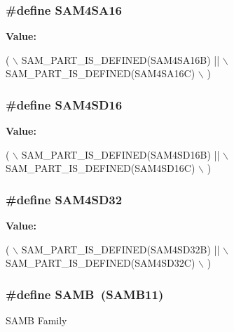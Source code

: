 \subsubsection[{S\+A\+M4\+S\+A16}]{\setlength{\rightskip}{0pt plus 5cm}\#define S\+A\+M4\+S\+A16}\label{group__sam__part__macros__group_ga51a0ff030b5d9e555653a4227538a888}
{\bfseries Value\+:}
\begin{DoxyCode}
( \(\backslash\)
        SAM\_PART\_IS\_DEFINED(SAM4SA16B) || \(\backslash\)
        SAM\_PART\_IS\_DEFINED(SAM4SA16C)    \(\backslash\)
    )
\end{DoxyCode}
\hypertarget{group__sam__part__macros__group_ga817106c645da5be09dd37af37d7fb805}{}
\subsubsection[{S\+A\+M4\+S\+D16}]{\setlength{\rightskip}{0pt plus 5cm}\#define S\+A\+M4\+S\+D16}\label{group__sam__part__macros__group_ga817106c645da5be09dd37af37d7fb805}
{\bfseries Value\+:}
\begin{DoxyCode}
( \(\backslash\)
        SAM\_PART\_IS\_DEFINED(SAM4SD16B) || \(\backslash\)
        SAM\_PART\_IS\_DEFINED(SAM4SD16C)    \(\backslash\)
    )
\end{DoxyCode}
\hypertarget{group__sam__part__macros__group_gaddfc17b115c4d5b5ff8b14eb2b8d4a2a}{}
\subsubsection[{S\+A\+M4\+S\+D32}]{\setlength{\rightskip}{0pt plus 5cm}\#define S\+A\+M4\+S\+D32}\label{group__sam__part__macros__group_gaddfc17b115c4d5b5ff8b14eb2b8d4a2a}
{\bfseries Value\+:}
\begin{DoxyCode}
( \(\backslash\)
        SAM\_PART\_IS\_DEFINED(SAM4SD32B) || \(\backslash\)
        SAM\_PART\_IS\_DEFINED(SAM4SD32C)    \(\backslash\)
    )
\end{DoxyCode}
\hypertarget{group__sam__part__macros__group_gafee38ed5a47634705a32ff589210928a}{}
\subsubsection[{S\+A\+M\+B}]{\setlength{\rightskip}{0pt plus 5cm}\#define S\+A\+M\+B~({\bf S\+A\+M\+B11})}\label{group__sam__part__macros__group_gafee38ed5a47634705a32ff589210928a}
S\+A\+M\+B Family \hypertarget{group__sam__part__macros__group_ga2af5455979bc458995adea5aaa7807a2}{}
